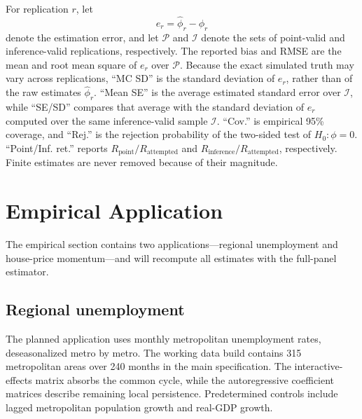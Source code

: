 \documentclass[11pt]{article}
\numberwithin{equation}{section}
\theoremstyle{remark}
\begin{document}
For replication $r$, let
\[
e_r=\widehat\phi_r-\phi_r
\]
denote the estimation error, and let $\mathcal P$ and $\mathcal I$ denote
the sets of point-valid and inference-valid replications, respectively.
The reported bias and RMSE are the mean and root mean square of $e_r$
over $\mathcal P$. Because the exact simulated truth may vary across
replications, ``MC SD'' is the standard deviation of $e_r$, rather than
of the raw estimates $\widehat\phi_r$. ``Mean SE'' is the average
estimated standard error over $\mathcal I$, while ``SE/SD'' compares
that average with the standard deviation of $e_r$ computed over the
same inference-valid sample $\mathcal I$. ``Cov.'' is empirical
95\% coverage, and ``Rej.'' is the rejection probability of the
two-sided test of $H_0:\phi=0$. ``Point/Inf. ret.'' reports
$R_{\mathrm{point}}/R_{\mathrm{attempted}}$ and
$R_{\mathrm{inference}}/R_{\mathrm{attempted}}$, respectively.
Finite estimates are never removed because of their magnitude.












\FloatBarrier

\section{Empirical Application}
\label{sec:application}

The empirical section contains two applications---regional unemployment and house-price momentum---and will recompute all estimates with the full-panel estimator.

\subsection{Regional unemployment}

The planned application uses monthly metropolitan unemployment rates, deseasonalized metro by metro. The working data build contains 315 metropolitan areas over 240 months in the main specification. The interactive-effects matrix absorbs the common cycle, while the autoregressive coefficient matrices describe remaining local persistence. Predetermined controls include lagged metropolitan population growth and real-GDP growth.
\end{document}
